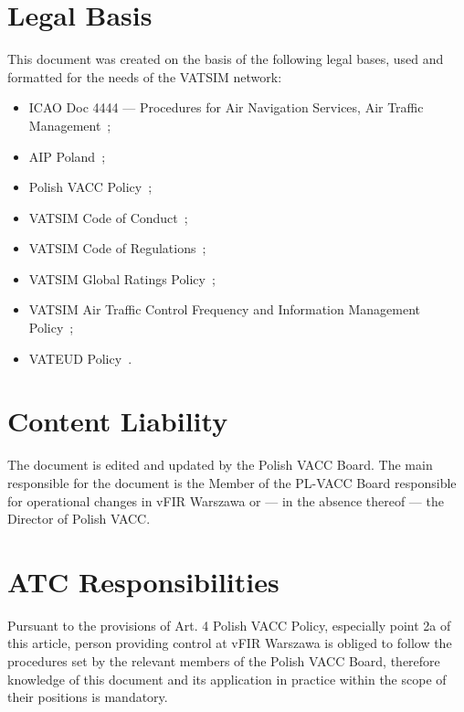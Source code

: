 \section{Legal Basis}
This document was created on the basis of the following legal bases, used and formatted for the needs of the VATSIM network:
\begin{itemize}
    \item ICAO Doc 4444 --- Procedures for Air Navigation Services, Air Traffic Management~\cite{4444};
    \item AIP Poland~\cite{aip};
    \item Polish VACC Policy~\cite{policy};
    \item VATSIM Code of Conduct~\cite{coc};
    \item VATSIM Code of Regulations~\cite{cor};
    \item VATSIM Global Ratings Policy~\cite{grp};
    \item VATSIM Air Traffic Control Frequency and Information Management Policy~\cite{atis};
    \item VATEUD Policy~\cite{vateud}.
\end{itemize}

\section{Content Liability}
The document is edited and updated by the Polish VACC Board. The main responsible for the document is the Member of the PL-VACC Board responsible for operational changes in vFIR Warszawa or --- in the absence thereof --- the Director of Polish VACC\@.

\section{ATC Responsibilities}
Pursuant to the provisions of Art. 4 Polish VACC Policy, especially point 2a of this article, person providing control at vFIR Warszawa is obliged to follow the procedures set by the relevant members of the Polish VACC Board, therefore knowledge of this document and its application in practice within the scope of their positions is mandatory.
